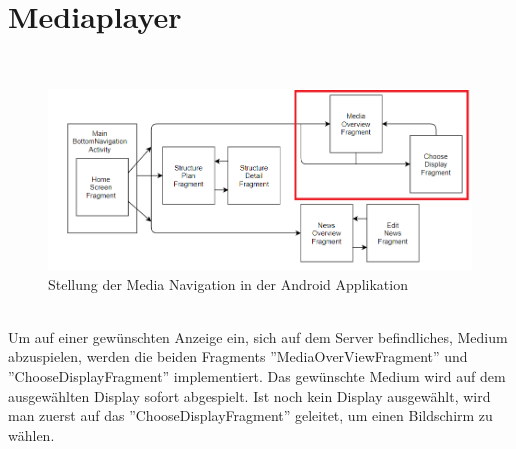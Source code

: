 \section{Mediaplayer}
\\
\begin{figure}[H]
\centering
\includegraphics[width=1.0\textwidth]{images/06_AndroidApp/06_AndroidArchPlayMedia}
\caption{Stellung der Media Navigation in der Android Applikation}
\label{fig:mediaNav}
\end{figure}
\\
Um auf einer gewünschten Anzeige ein, sich auf dem Server befindliches, Medium abzuspielen, werden die beiden Fragments ''MediaOverViewFragment'' und ''ChooseDisplayFragment'' implementiert. Das gewünschte Medium wird auf dem ausgewählten Display sofort abgespielt. Ist noch kein Display ausgewählt, wird man zuerst auf das ''ChooseDisplayFragment'' geleitet, um einen Bildschirm zu wählen.

